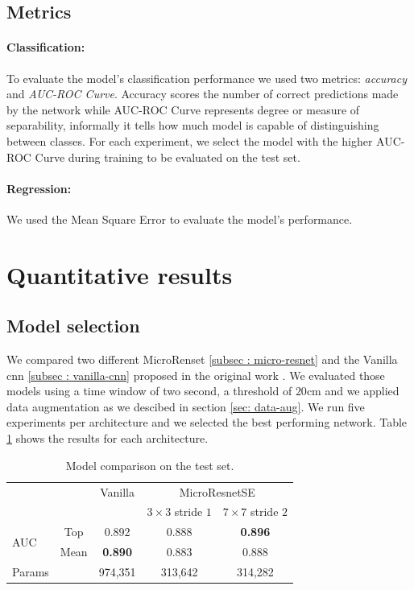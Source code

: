 \documentclass[../document.tex]{subfiles}
\begin{document}
\subsection{Metrics}

\paragraph{Classification:} To evaluate the model's classification performance we used two metrics: \emph{accuracy} and \emph{AUC-ROC Curve}. Accuracy scores the number of correct predictions made by the network while AUC-ROC Curve represents degree or measure of separability, informally it tells how much model is capable of distinguishing between classes. For each experiment, we select the model with the higher AUC-ROC Curve during training to be evaluated on the test set.



\paragraph{Regression:} We used the Mean Square Error to evaluate the model's performance.
\section{Quantitative results}
\subsection{Model selection}
We compared two different MicroRenset \ref{subsec : micro-resnet} and the Vanilla cnn \ref{subsec : vanilla-cnn} proposed in the original work \cite{omar2018traversability}. We evaluated those models using a time window of two second, a threshold of $20$cm and we applied data augmentation as we descibed in section \ref{sec: data-aug}. We run five experiments per architecture and we selected the best performing network. Table \ref{tab : models-results-comparison} shows the results for each architecture.

\begin{table}[ht]
  \centering
  \begin{tabular}{@{}lcccc@{}}
  \toprule
   && Vanilla & \multicolumn{2}{c}{MicroResnetSE} \\
  \cline{3-5}
  && & $3\times 3$ stride $1$ & $7\times7$ stride $2$\\ 
  \cline{3-5}
  \multirow{2}{*}{AUC} & Top & 0.892 & 0.888 & \textbf{0.896}\\
   & Mean & \textbf{0.890} & 0.883 & 0.888\\
  \cline{1-5}
  Params & & 974,351 & 313,642 & 314,282  \\
  \bottomrule   
\end{tabular}
\caption{Model comparison on the test set.}
\label{tab : models-results-comparison}
\end{table}
\end{document}
